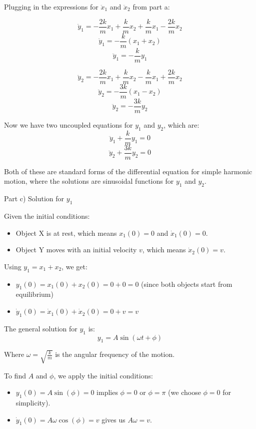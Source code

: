 Plugging in the expressions for \( \ddot{x}_1 \) and \( \ddot{x}_2 \) from part a:

\[ \ddot{y}_1 = -\frac{2k}{m}x_1 + \frac{k}{m}x_2 + \frac{k}{m}x_1 - \frac{2k}{m}x_2 \]
\[ \ddot{y}_1 = -\frac{k}{m}(x_1 + x_2) \]
\[ \ddot{y}_1 = -\frac{k}{m}y_1 \]

\[ \ddot{y}_2 = -\frac{2k}{m}x_1 + \frac{k}{m}x_2 - \frac{k}{m}x_1 + \frac{2k}{m}x_2 \]
\[ \ddot{y}_2 = -\frac{3k}{m}(x_1 - x_2) \]
\[ \ddot{y}_2 = -\frac{3k}{m}y_2 \]

Now we have two uncoupled equations for \( y_1 \) and \( y_2 \), which are:
\[ \ddot{y}_1 + \frac{k}{m}y_1 = 0 \]
\[ \ddot{y}_2 + \frac{3k}{m}y_2 = 0 \]

Both of these are standard forms of the differential equation for simple harmonic motion, where the solutions are sinusoidal functions for \( y_1 \) and \( y_2 \).

Part c) Solution for \( y_1 \)

Given the initial conditions:
\begin{itemize}
  \item Object X is at rest, which means \( x_1(0) = 0 \) and \( \dot{x}_1(0) = 0 \).
  \item Object Y moves with an initial velocity \( v \), which means \( \dot{x}_2(0) = v \).
\end{itemize}

Using \( y_1 = x_1 + x_2 \), we get:
\begin{itemize}
  \item \( y_1(0) = x_1(0) + x_2(0) = 0 + 0 = 0 \) (since both objects start from equilibrium)
  \item \( \dot{y}_1(0) = \dot{x}_1(0) + \dot{x}_2(0) = 0 + v = v \)
\end{itemize}

The general solution for \( y_1 \) is:
\[ y_1 = A \sin(\omega t + \phi) \]

Where \( \omega = \sqrt{\frac{k}{m}} \) is the angular frequency of the motion.

To find \( A \) and \( \phi \), we apply the initial conditions:
\begin{itemize}
  \item \( y_1(0) = A \sin(\phi) = 0 \) implies \( \phi = 0 \) or \( \phi = \pi \) (we choose \( \phi = 0 \) for simplicity).
  \item \( \dot{y}_1(0) = A \omega \cos(\phi) = v \) gives us \( A \omega = v \).
\end{itemize}

